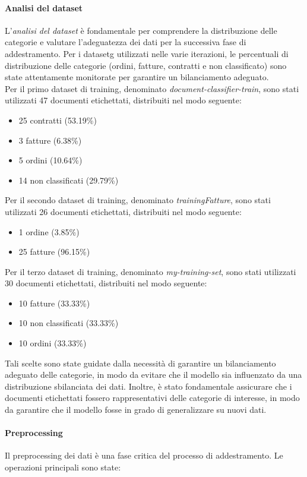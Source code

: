 \paragraph*{Analisi del dataset}
L'\emph{analisi del dataset} è fondamentale per comprendere la distribuzione delle categorie e valutare l'adeguatezza dei dati per la successiva fase di addestramento. Per i \gls{datasetg} utilizzati nelle varie iterazioni, le percentuali di distribuzione delle categorie (ordini, fatture, contratti e non classificato) sono state attentamente monitorate per garantire un bilanciamento adeguato.\\
Per il primo dataset di training, denominato \emph{document-classifier-train}, sono stati utilizzati 47 documenti etichettati, distribuiti nel modo seguente:
\begin{itemize}
    \item 25 contratti (53.19\%)
    \item 3 fatture (6.38\%)
    \item 5 ordini (10.64\%)
    \item 14 non classificati (29.79\%)
\end{itemize}
Per il secondo dataset di training, denominato \emph{trainingFatture}, sono stati utilizzati 26 documenti etichettati, distribuiti nel modo seguente:
\begin{itemize}
    \item 1 ordine (3.85\%)
    \item 25 fatture (96.15\%)
\end{itemize}
Per il terzo dataset di training, denominato \emph{my-training-set}, sono stati utilizzati 30 documenti etichettati, distribuiti nel modo seguente:
\begin{itemize}
    \item 10 fatture (33.33\%)
    \item 10 non classificati (33.33\%)
    \item 10 ordini (33.33\%)
\end{itemize}
Tali scelte sono state guidate dalla necessità di garantire un bilanciamento adeguato delle categorie, in modo da evitare che il modello sia influenzato da una distribuzione sbilanciata dei dati. Inoltre, è stato fondamentale assicurare che i documenti etichettati fossero rappresentativi delle categorie di interesse, in modo da garantire che il modello fosse in grado di generalizzare su nuovi dati.

\paragraph*{Preprocessing}
Il preprocessing dei dati è una fase critica del processo di addestramento. Le operazioni principali sono state:

